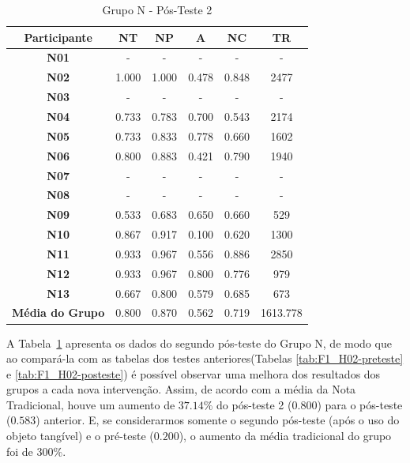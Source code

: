 \begin{table}[htbp]
	\centering
	\caption{Grupo N - Pós-Teste 2}		
	\begin{tabular}{|c|c|c|c|c|c|}
		\hline
		\rowcolor[HTML]{C0C0C0} 
		\textbf{Participante} & \textbf{NT} & \textbf{NP} & \textbf{A} & \textbf{NC} & \textbf{TR} \\ \hline
		\textbf{N01} & - & - & - & - & - \\ \hline
		\rowcolor[HTML]{EFEFEF} 
		\textbf{N02} & 1.000 & 1.000 & 0.478 & 0.848 & 2477 \\ \hline
		\textbf{N03} & - & - & - & - & - \\ \hline
		\rowcolor[HTML]{EFEFEF} 
		\textbf{N04} & 0.733 & 0.783 & 0.700 & 0.543 & 2174 \\ \hline
		\textbf{N05} & 0.733 & 0.833 & 0.778 & 0.660 & 1602 \\ \hline
		\rowcolor[HTML]{EFEFEF} 
		\textbf{N06} & 0.800 & 0.883 & 0.421 & 0.790 & 1940 \\ \hline
		\textbf{N07} & - & - & - & - & - \\ \hline
		\rowcolor[HTML]{EFEFEF} 
		\textbf{N08} & - & - & - & - & - \\ \hline
		\textbf{N09} & 0.533 & 0.683 & 0.650 & 0.660 & 529 \\ \hline
		\rowcolor[HTML]{EFEFEF} 
		\textbf{N10} & 0.867 & 0.917 & 0.100 & 0.620 & 1300 \\ \hline
		\textbf{N11} & 0.933 & 0.967 & 0.556 & 0.886 & 2850 \\ \hline
		\rowcolor[HTML]{EFEFEF} 
		\textbf{N12} & 0.933 & 0.967 & 0.800 & 0.776 & 979 \\ \hline
		\textbf{N13} & 0.667 & 0.800 & 0.579 & 0.685 & 673 \\ \hline
		\rowcolor[HTML]{EFEFEF} 
		\textbf{Média do Grupo} & 0.800 & 0.870 & 0.562 & 0.719 & 1613.778 \\ \hline
	\end{tabular}
	\label{tab:F1_H02-posteste2}
\end{table}

A Tabela~\ref{tab:F1_H02-posteste2} apresenta os dados do segundo pós-teste do Grupo N, de modo que ao compará-la com as tabelas dos testes anteriores(Tabelas \ref{tab:F1_H02-preteste} e \ref{tab:F1_H02-posteste}) é possível observar uma melhora dos resultados dos grupos a cada nova intervenção. Assim, de acordo com a média da Nota Tradicional, houve um aumento de $37.14\%$ do pós-teste 2 ($0.800$) para o pós-teste ($0.583$) anterior. E, se considerarmos somente o segundo pós-teste (após o uso do objeto tangível) e o pré-teste ($0.200$), o aumento da média tradicional do grupo foi de $300\%$.


